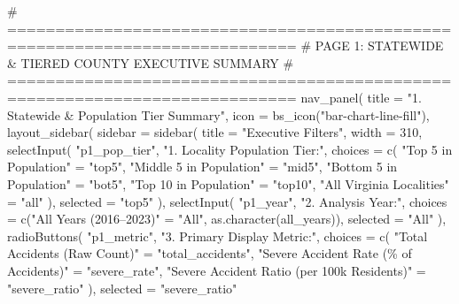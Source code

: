 \documentclass[
  letterpaper,
  DIV=11,
  numbers=noendperiod]{scrartcl}
\newenvironment{Shaded}{\begin{snugshade}}{\end{snugshade}}
\newcommand{\AttributeTok}[1]{\textcolor[rgb]{0.40,0.45,0.13}{#1}}
\newcommand{\CommentTok}[1]{\textcolor[rgb]{0.37,0.37,0.37}{#1}}
\newcommand{\DecValTok}[1]{\textcolor[rgb]{0.68,0.00,0.00}{#1}}
\newcommand{\FunctionTok}[1]{\textcolor[rgb]{0.28,0.35,0.67}{#1}}
\newcommand{\NormalTok}[1]{\textcolor[rgb]{0.00,0.23,0.31}{#1}}
\newcommand{\OtherTok}[1]{\textcolor[rgb]{0.00,0.23,0.31}{#1}}
\newcommand{\StringTok}[1]{\textcolor[rgb]{0.13,0.47,0.30}{#1}}
\begin{document}
\begin{Shaded}
\begin{Highlighting}[]
  \CommentTok{\# ============================================================================}
  \CommentTok{\# PAGE 1: STATEWIDE \& TIERED COUNTY EXECUTIVE SUMMARY}
  \CommentTok{\# ============================================================================}
  \FunctionTok{nav\_panel}\NormalTok{(}
    \AttributeTok{title =} \StringTok{"1. Statewide \& Population Tier Summary"}\NormalTok{,}
    \AttributeTok{icon =} \FunctionTok{bs\_icon}\NormalTok{(}\StringTok{"bar{-}chart{-}line{-}fill"}\NormalTok{),}
    \FunctionTok{layout\_sidebar}\NormalTok{(}
      \AttributeTok{sidebar =} \FunctionTok{sidebar}\NormalTok{(}
        \AttributeTok{title =} \StringTok{"Executive Filters"}\NormalTok{,}
        \AttributeTok{width =} \DecValTok{310}\NormalTok{,}
        \FunctionTok{selectInput}\NormalTok{(}
          \StringTok{"p1\_pop\_tier"}\NormalTok{,}
          \StringTok{"1. Locality Population Tier:"}\NormalTok{,}
          \AttributeTok{choices =} \FunctionTok{c}\NormalTok{(}
            \StringTok{"Top 5 in Population"}    \OtherTok{=} \StringTok{"top5"}\NormalTok{,}
            \StringTok{"Middle 5 in Population"} \OtherTok{=} \StringTok{"mid5"}\NormalTok{,}
            \StringTok{"Bottom 5 in Population"} \OtherTok{=} \StringTok{"bot5"}\NormalTok{,}
            \StringTok{"Top 10 in Population"}   \OtherTok{=} \StringTok{"top10"}\NormalTok{,}
            \StringTok{"All Virginia Localities"} \OtherTok{=} \StringTok{"all"}
\NormalTok{          ),}
          \AttributeTok{selected =} \StringTok{"top5"}
\NormalTok{        ),}
        \FunctionTok{selectInput}\NormalTok{(}
          \StringTok{"p1\_year"}\NormalTok{,}
          \StringTok{"2. Analysis Year:"}\NormalTok{,}
          \AttributeTok{choices =} \FunctionTok{c}\NormalTok{(}\StringTok{"All Years (2016–2023)"} \OtherTok{=} \StringTok{"All"}\NormalTok{, }\FunctionTok{as.character}\NormalTok{(all\_years)),}
          \AttributeTok{selected =} \StringTok{"All"}
\NormalTok{        ),}
        \FunctionTok{radioButtons}\NormalTok{(}
          \StringTok{"p1\_metric"}\NormalTok{,}
          \StringTok{"3. Primary Display Metric:"}\NormalTok{,}
          \AttributeTok{choices =} \FunctionTok{c}\NormalTok{(}
            \StringTok{"Total Accidents (Raw Count)"}                \OtherTok{=} \StringTok{"total\_accidents"}\NormalTok{,}
            \StringTok{"Severe Accident Rate (\% of Accidents)"}      \OtherTok{=} \StringTok{"severe\_rate"}\NormalTok{,}
            \StringTok{"Severe Accident Ratio (per 100k Residents)"} \OtherTok{=} \StringTok{"severe\_ratio"}
\NormalTok{          ),}
          \AttributeTok{selected =} \StringTok{"severe\_ratio"}

\end{Highlighting}
\end{Shaded}
\end{document}
